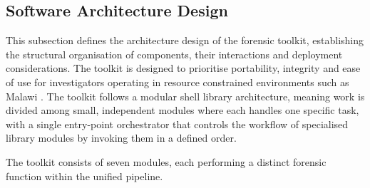 \documentclass[12pt,a4paper]{report}
\begin{document}
\subsection{Software Architecture Design}

This subsection defines the architecture design of the forensic toolkit, establishing the structural organisation of components, their interactions and deployment considerations. The toolkit is designed to prioritise portability, integrity and ease of use for investigators operating in resource constrained environments such as Malawi \citep{chimoyo2024, mtegha2024}. The toolkit follows a modular shell library architecture, meaning work is divided among small, independent modules where each handles one specific task, with a single entry-point orchestrator that controls the workflow of specialised library modules by invoking them in a defined order.

The toolkit consists of seven modules, each performing a distinct forensic function within the unified pipeline.
\end{document}
